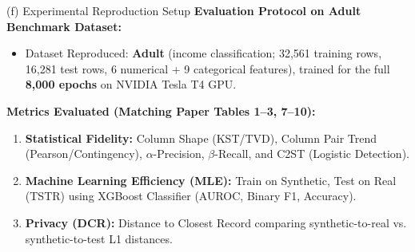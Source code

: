 \documentclass[aspectratio=169, 10pt]{beamer}
\begin{document}
\begin{frame}{(f) Experimental Reproduction Setup}
  \textbf{Evaluation Protocol on Adult Benchmark Dataset:}
  \begin{itemize}
    \item Dataset Reproduced: \textbf{Adult} (income classification; 32,561 training rows, 16,281 test rows, 6 numerical + 9 categorical features), trained for the full \textbf{8,000 epochs} on NVIDIA Tesla T4 GPU.
  \end{itemize}
  \vspace{0.2cm}
  \textbf{Metrics Evaluated (Matching Paper Tables 1--3, 7--10):}
  \begin{enumerate}
    \item \textbf{Statistical Fidelity:} Column Shape (KST/TVD), Column Pair Trend (Pearson/Contingency), $\alpha$-Precision, $\beta$-Recall, and C2ST (Logistic Detection).
    \item \textbf{Machine Learning Efficiency (MLE):} Train on Synthetic, Test on Real (TSTR) using XGBoost Classifier (AUROC, Binary F1, Accuracy).
    \item \textbf{Privacy (DCR):} Distance to Closest Record comparing synthetic-to-real vs. synthetic-to-test L1 distances.
  \end{enumerate}
\end{frame}
\end{document}
